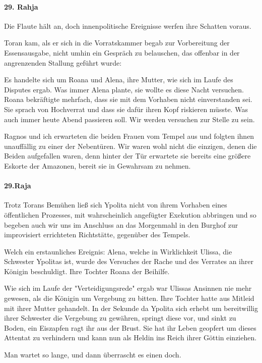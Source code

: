 \paragraph{29. Rahja}
Die Flaute hält an, doch innenpolitische Ereignisse werfen ihre Schatten voraus.

Toran kam, als er sich in die Vorratskammer begab zur Vorbereitung der Essensausgabe, nicht umhin ein Gespräch zu belauschen, das offenbar in der angrenzenden Stallung geführt wurde:

Es handelte sich um Roana und Alena, ihre Mutter, wie sich im Laufe des Disputes ergab. Was immer Alena plante, sie wollte es diese Nacht versuchen. Roana bekräftigte mehrfach, dass sie mit dem Vorhaben nicht einverstanden sei. Sie sprach von Hochverrat und dass sie dafür ihren Kopf riskieren müsste.
Was auch immer heute Abend passieren soll. Wir werden versuchen zur Stelle zu sein.

Ragnos und ich erwarteten die beiden Frauen vom Tempel aus und folgten ihnen unauffällig zu einer der Nebentüren.
Wir waren wohl nicht die einzigen, denen die Beiden aufgefallen waren, denn hinter der Tür erwartete sie bereits eine größere Eskorte der Amazonen, bereit sie in Gewahrsam zu nehmen.

\paragraph{29.Raja}
Trotz Torans Bemühen ließ sich Ypolita nicht von ihrem Vorhaben eines öffentlichen Prozesses, mit wahrscheinlich angefügter Exekution abbringen und so begeben auch wir uns im Anschluss an das Morgenmahl in den Burghof zur improvisiert errichteten Richtstätte, gegenüber des Tempels.

Welch ein erstaunliches Ereignis:
Alena, welche in Wirklichkeit Ulissa, die Schwester Ypolitas ist, wurde des Versuches der Rache und des Verrates an ihrer Königin beschuldigt. Ihre Tochter Roana der Beihilfe.

Wie sich im Laufe der "Verteidigungsrede" ergab war Ulissas Ansinnen nie mehr gewesen, als die Königin um Vergebung zu bitten. Ihre Tochter hatte aus Mitleid mit ihrer Mutter gehandelt. In der Sekunde da Ypolita sich erhebt um bereitwillig ihrer Schwester die Vergebung zu gewähren, springt diese vor, und sinkt zu Boden, ein Eiszapfen ragt ihr aus der Brust. Sie hat ihr Leben geopfert um dieses Attentat zu verhindern und kann nun als Heldin ins Reich ihrer Göttin einziehen.

Man wartet so lange, und dann überrascht es einen doch.


